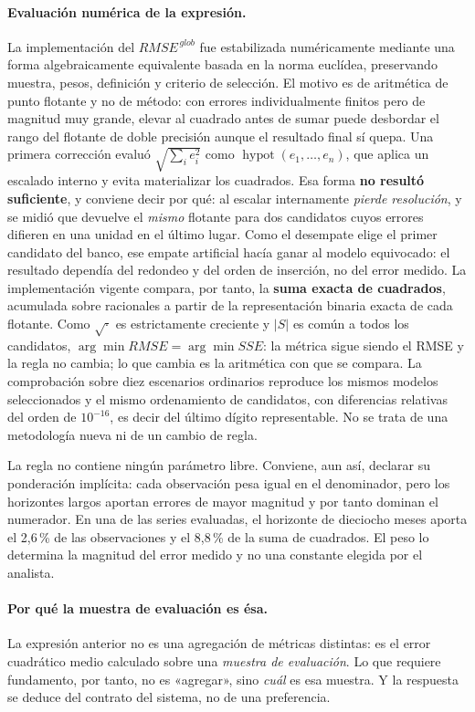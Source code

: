 \documentclass[12pt,letterpaper]{article}
\begin{document}
\paragraph{Evaluación numérica de la expresión.} La implementación del \(RMSE^{\,glob}\) fue estabilizada numéricamente mediante una forma algebraicamente equivalente basada en la norma euclídea, preservando muestra, pesos, definición y criterio de selección. El motivo es de aritmética de punto flotante y no de método: con errores individualmente finitos pero de magnitud muy grande, elevar al cuadrado antes de sumar puede desbordar el rango del flotante de doble precisión aunque el resultado final sí quepa. Una primera corrección evaluó \(\sqrt{\sum_i e_i^{2}}\) como \(\operatorname{hypot}(e_1,\dots,e_n)\), que aplica un escalado interno y evita materializar los cuadrados. Esa forma \textbf{no resultó suficiente}, y conviene decir por qué: al escalar internamente \emph{pierde resolución}, y se midió que devuelve el \emph{mismo} flotante para dos candidatos cuyos errores difieren en una unidad en el último lugar. Como el desempate elige el primer candidato del banco, ese empate artificial hacía ganar al modelo equivocado: el resultado dependía del redondeo y del orden de inserción, no del error medido. La implementación vigente compara, por tanto, la \textbf{suma exacta de cuadrados}, acumulada sobre racionales a partir de la representación binaria exacta de cada flotante. Como \(\sqrt{\cdot}\) es estrictamente creciente y \(|S|\) es común a todos los candidatos, \(\arg\min RMSE = \arg\min SSE\): la métrica sigue siendo el RMSE y la regla no cambia; lo que cambia es la aritmética con que se compara. La comprobación sobre diez escenarios ordinarios reproduce los mismos modelos seleccionados y el mismo ordenamiento de candidatos, con diferencias relativas del orden de \(10^{-16}\), es decir del último dígito representable. No se trata de una metodología nueva ni de un cambio de regla.

La regla no contiene ningún parámetro libre. Conviene, aun así, declarar su ponderación implícita: cada observación pesa igual en el denominador, pero los horizontes largos aportan errores de mayor magnitud y por tanto dominan el numerador. En una de las series evaluadas, el horizonte de dieciocho meses aporta el 2,6\,\% de las observaciones y el 8,8\,\% de la suma de cuadrados. El peso lo determina la magnitud del error medido y no una constante elegida por el analista.

\paragraph{Por qué la muestra de evaluación es ésa.} La expresión anterior no es una agregación de métricas distintas: es el error cuadrático medio calculado sobre una \emph{muestra de evaluación}. Lo que requiere fundamento, por tanto, no es «agregar», sino \emph{cuál} es esa muestra. Y la respuesta se deduce del contrato del sistema, no de una preferencia.
\end{document}
